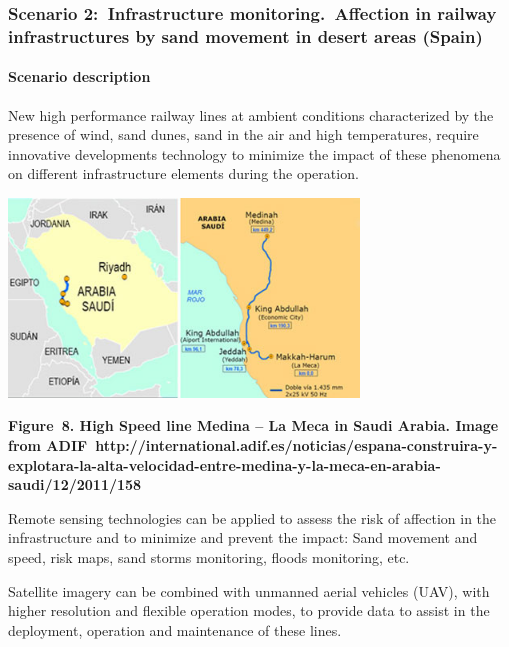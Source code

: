 \documentclass[a4paper]{article}
\begin{document}
\bigskip

\clearpage
\bigskip

\subsubsection[Scenario 2:\ Infrastructure monitoring.\ Affection in
railway infrastructures by sand movement in desert areas
(Spain)]{Scenario 2:\ \foreignlanguage{english}{Infrastructure
monitoring.\ }\foreignlanguage{english}{Affection in railway
infrastructures by sand movement in desert areas (Spain)}}
\hypertarget{Toc381777195}{}\paragraph[Scenario description]{Scenario
description}
New high performance railway lines at ambient conditions characterized
by the presence of wind, sand dunes, sand in the air and high
temperatures, require innovative developments technology to minimize
the impact of these phenomena on different infrastructure elements
during the operation.

{\centering 
\includegraphics[width=3.66556in,height=2.08252in]{out-img12.png} \par}

{\centering\bfseries
Figure\ 8. High Speed line Medina -- La Meca in Saudi Arabia. Image from
ADIF\ http://international.adif.es/noticias/espana-construira-y-explotara-la-alta-velocidad-entre-medina-y-la-meca-en-arabia-saudi/12/2011/158
\par}


\bigskip

Remote sensing technologies can be applied to assess the risk of
affection in the infrastructure and to minimize and prevent the impact:
Sand movement and speed, risk maps, sand storms monitoring, floods
monitoring, etc.


\bigskip

Satellite imagery can be combined with unmanned aerial vehicles (UAV),
with higher resolution and flexible operation modes, to provide data to
assist in the deployment, operation and maintenance of these lines.\ 
\end{document}
